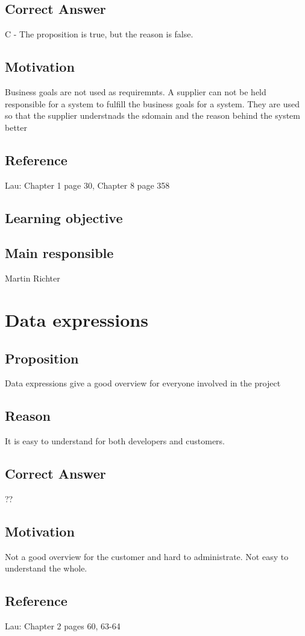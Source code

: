\documentclass[a4paper]{article}
\begin{document}
\subsection{Correct Answer}
C - The proposition is true, but the reason is false.
\subsection{Motivation}
Business goals are not used as requiremnts. A supplier can not be held responsible for a system to fulfill the business goals for a system. They are used so that the supplier understnads the sdomain and the reason behind the system better

\subsection{Reference}
Lau: Chapter 1 page 30, Chapter 8 page 358
\subsection{Learning objective}

\subsection{Main responsible}
Martin Richter


\section{Data expressions}
\subsection{Proposition}
Data expressions give a good overview for everyone involved in the project
\subsection{Reason}
It is easy to understand for both developers and customers. 
\subsection{Correct Answer}
??
\subsection{Motivation}
Not a good overview for the customer and hard to administrate. Not easy to understand the whole.
\subsection{Reference}
Lau: Chapter 2 pages 60, 63-64
\end{document}
